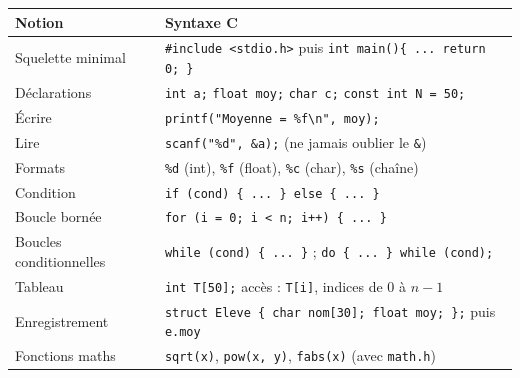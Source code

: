 \documentclass[11pt]{article}
\begin{document}
\begin{propriete}
\begin{center}
\begin{tabularx}{\linewidth}{|l|X|}
\hline
\rowcolor{popblueL} \textbf{Notion} & \textbf{Syntaxe C} \\
\hline
Squelette minimal & \texttt{\#include <stdio.h>} puis \texttt{int main()\{ ... return 0; \}} \\
\hline
Déclarations & \texttt{int a;} \quad \texttt{float moy;} \quad \texttt{char c;} \quad \texttt{const int N = 50;} \\
\hline
Écrire & \texttt{printf("Moyenne = \%f\textbackslash n", moy);} \\
\hline
Lire & \texttt{scanf("\%d", \&a);} \quad (ne jamais oublier le \texttt{\&}) \\
\hline
Formats & \texttt{\%d} (int), \texttt{\%f} (float), \texttt{\%c} (char), \texttt{\%s} (chaîne) \\
\hline
Condition & \texttt{if (cond) \{ ... \} else \{ ... \}} \\
\hline
Boucle bornée & \texttt{for (i = 0; i < n; i++) \{ ... \}} \\
\hline
Boucles conditionnelles & \texttt{while (cond) \{ ... \}} \quad ; \quad \texttt{do \{ ... \} while (cond);} \\
\hline
Tableau & \texttt{int T[50];} \quad accès : \texttt{T[i]}, indices de $0$ à $n-1$ \\
\hline
Enregistrement & \texttt{struct Eleve \{ char nom[30]; float moy; \};} puis \texttt{e.moy} \\
\hline
Fonctions maths & \texttt{sqrt(x)}, \texttt{pow(x, y)}, \texttt{fabs(x)} (avec \texttt{math.h}) \\
\hline
\end{tabularx}
\end{center}
\end{propriete}
\end{document}
